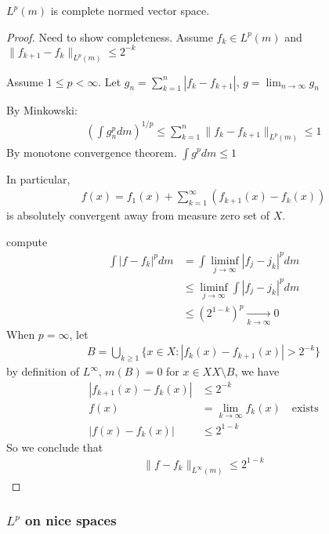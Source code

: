  \begin{theorem}
 	$L^{p}(m)$ is complete normed vector space.
 \end{theorem}

 \begin{proof}
 	Need to show completeness.
Assume $f_{k} \in L^{p} (m)$ and
$\| f_{k + 1} - f_{k} \|_{L^{p} (m)} \leq 2^{-k}$

Assume $1 \leq p < \infty$. Let  $g_{n} = \sum_{k=1}^{n} | f_{k}- f_{k+1} |$, $g = \lim_{n \to \infty} g_{n}$

By Minkowski:
\begin{align*}
	\left( \int g_{n}^{p} dm \right)^{1/p} \leq \sum_{k=1}^{n} \|f_{k} - f_{k+1} \|_{L^{p}(m)} \leq 1
\end{align*} By monotone convergence theorem. $\int g^p dm \leq 1$

In particular,
\begin{align*}
	f(x) = f_{1} (x) + \sum_{k=1}^{\infty} (f_{k+1}(x) - f_{k}(x))
\end{align*} is absolutely convergent away from measure zero set of $X$.

compute
\begin{align*}
	\int | f - f_{k} |^{p} dm &= \int \liminf_{j \to \infty} |f_{j} - j_{k} |^{p} dm \\
							  &\leq \liminf_{j \to \infty}\int  |f_{j} - j_{k} |^{p} dm \\
							  &\leq (2^{1-k})^{p} \xrightarrow[k \to \infty]{} 0
\end{align*}
When $p = \infty$, let
\begin{align*}
	B = \bigcup_{k \geq 1} \{x \in X : |f_{k} (x) - f_{k +1} (x) | > 2^{-k}\}
\end{align*} by definition of $L^{\infty}$, $m(B) = 0$ for  $x \in XX \setminus B$, we have
\begin{align*}
	|f_{k +1} (x) - f_{k} (x)| &\leq 2^{-k} \\
	f(x) &=\lim_{k \to \infty} f_{k}(x) \quad \text{exists} \\
	|f (x) - f_{k} (x) | &\leq 2^{1-k}
\end{align*} So we conclude that
\begin{align*}
	\| f - f_{k} \|_{L^{\infty} (m)} \leq 2^{1 - k}
\end{align*}
 \end{proof}

\subsubsection{\texorpdfstring{$L^{p}$ on nice spaces}{Lp on nice spaces}}

